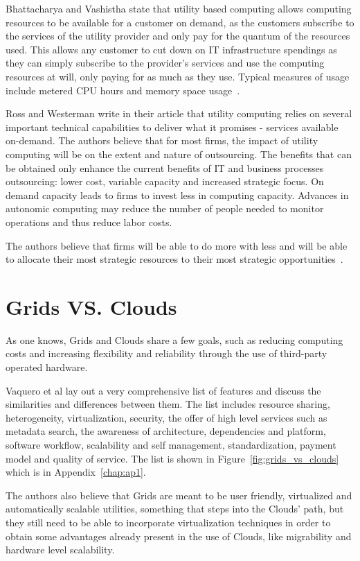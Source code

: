 Bhattacharya and Vashistha state that utility based computing allows computing resources to be available for a customer on demand, as the customers subscribe to the services of the utility provider and only pay for the quantum of the resources used. This allows any customer to cut down on IT infrastructure spendings as they can simply subscribe to the provider's services and use the computing resources at will, only paying for as much as they use. Typical measures of usage include metered CPU hours and memory space usage~\cite{bhatta-utility}.

Ross and Westerman write in their article that utility computing relies on several important technical capabilities to deliver what it promises - services available on-demand. The authors believe that for most firms, the impact of utility computing will be on the extent and nature of outsourcing. The benefits that can be obtained only enhance the current benefits of IT and business processes outsourcing: lower cost, variable capacity and increased strategic focus. On demand capacity leads to firms to invest less in computing capacity. Advances in autonomic computing may reduce the number of people needed to monitor operations and thus reduce labor costs.

The authors believe that firms will be able to do more with less and will be able to allocate their most strategic resources to their most strategic opportunities~\cite{ross}.

\section{Grids VS. Clouds} \label{sec:gridsvsclouds}

As one knows, Grids and Clouds share a few goals, such as reducing computing costs and increasing flexibility and reliability through the use of third-party operated hardware.

Vaquero et al lay out a very comprehensive list of features and discuss the similarities and differences between them. The list includes resource sharing, heterogeneity, virtualization, security, the offer of high level services such as metadata search, the awareness of architecture, dependencies and platform, software workflow, scalability and self management, standardization, payment model and quality of service. The list is shown in Figure~\ref{fig:grids_vs_clouds} which is in Appendix~\ref{chap:ap1}.

The authors also believe that Grids are meant to be user friendly, virtualized and automatically scalable utilities, something that steps into the Clouds’ path, but they still need to be able to incorporate virtualization techniques in order to obtain some advantages already present in the use of Clouds, like migrability and hardware level scalability.\cite{vaquero}

